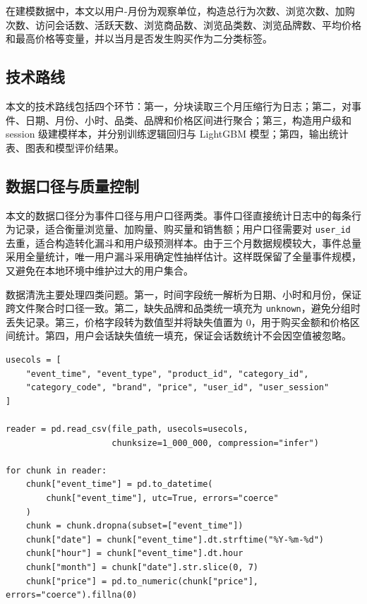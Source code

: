 \documentclass[12pt,hyperref,a4paper,UTF8]{ctexart}
\begin{document}
在建模数据中，本文以用户-月份为观察单位，构造总行为次数、浏览次数、加购次数、访问会话数、活跃天数、浏览商品数、浏览品类数、浏览品牌数、平均价格和最高价格等变量，并以当月是否发生购买作为二分类标签。

\subsection{技术路线}

本文的技术路线包括四个环节：第一，分块读取三个月压缩行为日志；第二，对事件、日期、月份、小时、品类、品牌和价格区间进行聚合；第三，构造用户级和 session 级建模样本，并分别训练逻辑回归与 LightGBM 模型；第四，输出统计表、图表和模型评价结果。

\subsection{数据口径与质量控制}

本文的数据口径分为事件口径与用户口径两类。事件口径直接统计日志中的每条行为记录，适合衡量浏览量、加购量、购买量和销售额；用户口径需要对 \texttt{user\_id} 去重，适合构造转化漏斗和用户级预测样本。由于三个月数据规模较大，事件总量采用全量统计，唯一用户漏斗采用确定性抽样估计。这样既保留了全量事件规模，又避免在本地环境中维护过大的用户集合。

数据清洗主要处理四类问题。第一，时间字段统一解析为日期、小时和月份，保证跨文件聚合时口径一致。第二，缺失品牌和品类统一填充为 \texttt{unknown}，避免分组时丢失记录。第三，价格字段转为数值型并将缺失值置为 0，用于购买金额和价格区间统计。第四，用户会话缺失值统一填充，保证会话数统计不会因空值被忽略。

\begin{lstlisting}[caption={分块读取与核心字段清洗示例}]
usecols = [
    "event_time", "event_type", "product_id", "category_id",
    "category_code", "brand", "price", "user_id", "user_session"
]

reader = pd.read_csv(file_path, usecols=usecols,
                     chunksize=1_000_000, compression="infer")

for chunk in reader:
    chunk["event_time"] = pd.to_datetime(
        chunk["event_time"], utc=True, errors="coerce"
    )
    chunk = chunk.dropna(subset=["event_time"])
    chunk["date"] = chunk["event_time"].dt.strftime("%Y-%m-%d")
    chunk["hour"] = chunk["event_time"].dt.hour
    chunk["month"] = chunk["date"].str.slice(0, 7)
    chunk["price"] = pd.to_numeric(chunk["price"], errors="coerce").fillna(0)
\end{lstlisting}
\end{document}
